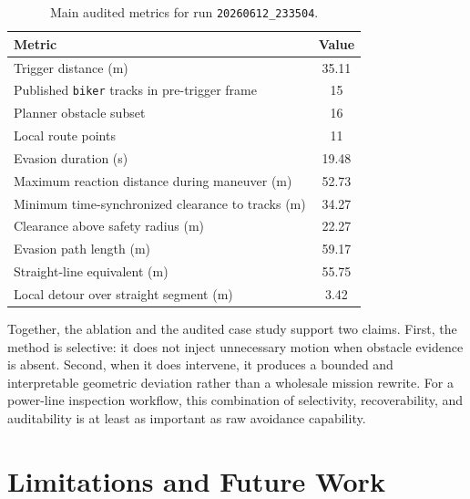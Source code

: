 \documentclass[journal,twoside,web]{ieeecolor}
\begin{document}
\begin{table}[t]
    \centering
    \small
    \begin{tabular}{@{}p{} S[table-format=3.2]@{}}
        \toprule
        \textbf{Metric} & {\textbf{Value}} \\
        \midrule
        Trigger distance (m) & 35.11 \\
        Published \texttt{biker} tracks in pre-trigger frame & 15 \\
        Planner obstacle subset & 16 \\
        Local route points & 11 \\
        Evasion duration (s) & 19.48 \\
        Maximum reaction distance during maneuver (m) & 52.73 \\
        Minimum time-synchronized clearance to tracks (m) & 34.27 \\
        Clearance above safety radius (m) & 22.27 \\
        Evasion path length (m) & 59.17 \\
        Straight-line equivalent (m) & 55.75 \\
        Local detour over straight segment (m) & 3.42 \\
        \bottomrule
    \end{tabular}
    \caption{Main audited metrics for run \texttt{20260612\_233504}.}
    \label{tab:case}
\end{table}

Together, the ablation and the audited case study support two claims. First, the method is selective: it does not inject unnecessary motion when obstacle evidence is absent. Second, when it does intervene, it produces a bounded and interpretable geometric deviation rather than a wholesale mission rewrite. For a power-line inspection workflow, this combination of selectivity, recoverability, and auditability is at least as important as raw avoidance capability.


\section{Limitations and Future Work}
\end{document}
